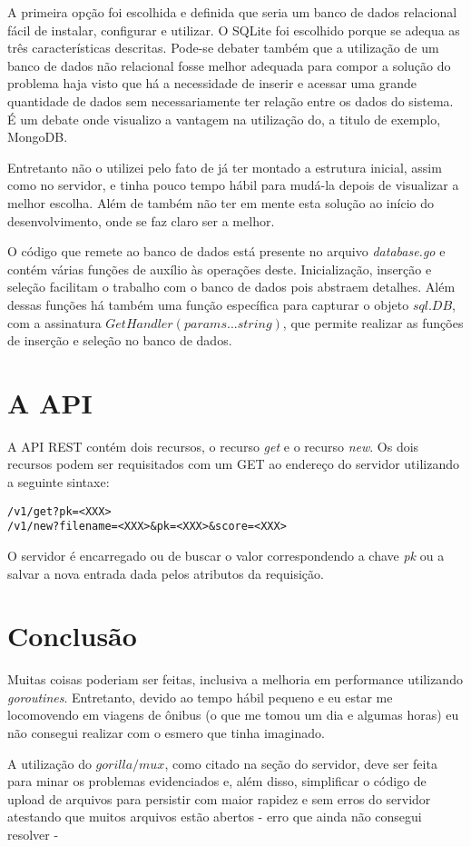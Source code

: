 \documentclass[a4paper, 12pt]{article}
\begin{document}
A primeira opção foi escolhida e definida que seria um banco de dados relacional
fácil de instalar, configurar e utilizar. O SQLite foi escolhido porque se
adequa as três características descritas. Pode-se debater também que a
utilização de um banco de dados não relacional fosse melhor adequada para compor
a solução do problema haja visto que há a necessidade de inserir e acessar uma
grande quantidade de dados sem necessariamente ter relação entre os dados do
sistema. É um debate onde visualizo a vantagem na utilização do, a titulo de
exemplo, MongoDB.

Entretanto não o utilizei pelo fato de já ter montado a estrutura inicial, assim
como no servidor, e tinha pouco tempo hábil para mudá-la depois de visualizar a
melhor escolha. Além de também não ter em mente esta solução ao início do
desenvolvimento, onde se faz claro ser a melhor.

O código que remete ao banco de dados está presente no arquivo \emph{database.go} e
contém várias funções de auxílio às operações deste. Inicialização, inserção e
seleção facilitam o trabalho com o banco de dados pois abstraem detalhes. Além
dessas funções há também uma função específica para capturar o objeto \(sql.DB\),
com a assinatura \(GetHandler(params ...string)\), que permite realizar as funções
de inserção e seleção no banco de dados.

\section{A API}
\label{sec:org7b9bc72}

A API REST contém dois recursos, o recurso \emph{get} e o recurso \emph{new}. Os dois
recursos podem ser requisitados com um GET ao endereço do servidor utilizando
a seguinte sintaxe:

\begin{verbatim}
/v1/get?pk=<XXX>
/v1/new?filename=<XXX>&pk=<XXX>&score=<XXX>
\end{verbatim}

O servidor é encarregado ou de buscar o valor correspondendo a chave \emph{pk} ou
a salvar a nova entrada dada pelos atributos da requisição.

\section{Conclusão}
\label{sec:org99d8474}

Muitas coisas poderiam ser feitas, inclusiva a melhoria em performance utilizando
\emph{goroutines}. Entretanto, devido ao tempo hábil pequeno e eu estar me locomovendo
em viagens de ônibus (o que me tomou um dia e algumas horas) eu não consegui
realizar com o esmero que tinha imaginado.

A utilização do \(gorilla/mux\), como citado na seção do servidor, deve ser feita
para minar os problemas evidenciados e, além disso, simplificar o código de
upload de arquivos para persistir com maior rapidez e sem erros do servidor
atestando que muitos arquivos estão abertos - erro que ainda não consegui
resolver -
\end{document}
